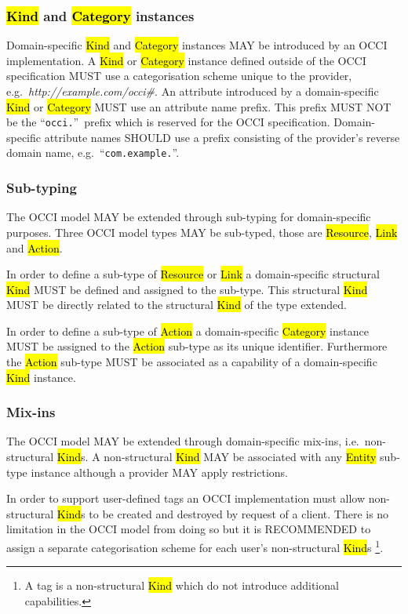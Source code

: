 \documentclass[10pt,a4paper,british]{article}
\begin{document}
\subsubsection{\hl{Kind} and \hl{Category} instances}
\label{sec:ext:category}
Domain-specific \hl{Kind} and \hl{Category} instances MAY be introduced by an
OCCI implementation.
%
A \hl{Kind} or \hl{Category} instance defined outside of the OCCI
specification MUST use a categorisation scheme unique to the provider,
e.g.~\textit{http://example.com/occi\#}.
%
An attribute introduced by a domain-specific \hl{Kind} or \hl{Category} MUST
use an attribute name prefix. This prefix MUST NOT be the ``\texttt{occi.}''~prefix
which is reserved for the OCCI specification. Domain-specific attribute names
SHOULD use a prefix consisting of the provider's reverse domain name,
e.g.~``\texttt{com.example.}''.

\subsubsection{Sub-typing}
The OCCI model MAY be extended through sub-typing for domain-specific purposes.
Three OCCI model types MAY be sub-typed, those are \hl{Resource}, \hl{Link} and
\hl{Action}.

In order to define a sub-type of \hl{Resource} or \hl{Link} a domain-specific
structural \hl{Kind} MUST be defined and assigned to the sub-type. This
structural \hl{Kind} MUST be directly related to the structural \hl{Kind} of
the type extended.

In order to define a sub-type of \hl{Action} a domain-specific \hl{Category}
instance MUST be assigned to the \hl{Action} sub-type as its unique identifier.
Furthermore the \hl{Action} sub-type MUST be associated as a capability of a
domain-specific \hl{Kind} instance.

\subsubsection{Mix-ins}
The OCCI model MAY be extended through domain-specific mix-ins,
i.e.~non-structural \hl{Kind}s.  A non-structural \hl{Kind} MAY be associated
with any \hl{Entity} sub-type instance although a provider MAY apply
restrictions.

In order to support user-defined tags an OCCI implementation must allow
non-structural \hl{Kind}s to be created and destroyed by request of a client.
There is no limitation in the OCCI model from doing so but it is RECOMMENDED to
assign a separate categorisation scheme for each user's non-structural
\hl{Kind}s%
\footnote{A tag is a non-structural \hl{Kind} which do not introduce additional
capabilities.}.
\end{document}

